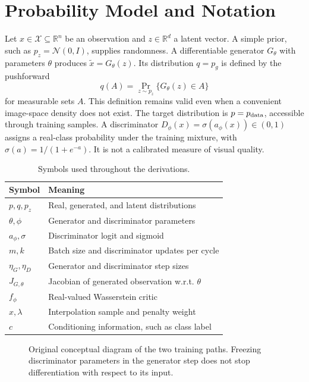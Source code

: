 \documentclass[conference]{IEEEtran}
\begin{document}
\section{Probability Model and Notation}
Let $x\in\mathcal X\subseteq\mathbb R^n$ be an observation and $z\in\mathbb R^d$ a latent vector. A simple prior, such as $p_z=\mathcal N(0,I)$, supplies randomness. A differentiable generator $G_\theta$ with parameters $\theta$ produces $\tilde x=G_\theta(z)$. Its distribution $q=p_g$ is defined by the pushforward
\begin{equation}
q(A)=\Pr_{z\sim p_z}\{G_\theta(z)\in A\}
\end{equation}
for measurable sets $A$. This definition remains valid even when a convenient image-space density does not exist. The target distribution is $p=p_{\rm data}$, accessible through training samples. A discriminator $D_\phi(x)=\sigma(a_\phi(x))\in(0,1)$ assigns a real-class probability under the training mixture, with $\sigma(a)=1/(1+e^{-a})$. It is not a calibrated measure of visual quality.

\begin{table}[t]\caption{Symbols used throughout the derivations.}\centering\small
\begin{tabular}{ll}\toprule
Symbol & Meaning\\\midrule
$p,q,p_z$ & Real, generated, and latent distributions\\
$\theta,\phi$ & Generator and discriminator parameters\\
$a_\phi,\sigma$ & Discriminator logit and sigmoid\\
$m,k$ & Batch size and discriminator updates per cycle\\
$\eta_G,\eta_D$ & Generator and discriminator step sizes\\
$J_{G,\theta}$ & Jacobian of generated observation w.r.t. $\theta$\\
$f_\phi$ & Real-valued Wasserstein critic\\
$\hat x,\lambda$ & Interpolation sample and penalty weight\\
$c$ & Conditioning information, such as class label\\\bottomrule
\end{tabular}\end{table}

\begin{figure}[t]\centering
{}
\caption{Original conceptual diagram of the two training paths. Freezing discriminator parameters in the generator step does not stop differentiation with respect to its input.}\label{fig:flow}
\end{figure}
\end{document}
